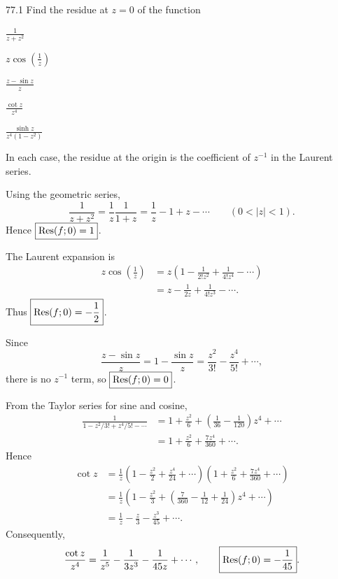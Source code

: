 \documentclass[11pt,oneside]{article}
\begin{document}

\begin{exercise}{77.1}
Find the residue at $z=0$ of the function
\begin{exercisesubparts}
    \item $\displaystyle\frac{1}{z+z^2}$
    \item $\displaystyle z\cos\left(\frac1z\right)$
    \item $\displaystyle\frac{z-\sin z}{z}$
    \item $\displaystyle\frac{\cot z}{z^4}$
    \item $\displaystyle\frac{\sinh z}{z^4(1-z^2)}$
\end{exercisesubparts}
\end{exercise}

\begin{solution}
In each case, the residue at the origin is the coefficient of $z^{-1}$ in the Laurent series.
\begin{exercisesubparts}
    \item Using the geometric series,
    \[
        \frac1{z+z^2}=\frac1z\frac1{1+z}
        =\frac1z-1+z-\cdots\qquad(0<|z|<1).
    \]
    Hence $\boxed{\operatorname{Res}(f; 0)=1}$.

    \item The Laurent expansion is
    \[
    \begin{aligned}
        z\cos\left(\frac1z\right)
        &=z\left(1-\frac1{2!z^2}+\frac1{4!z^4}-\cdots\right)\\
        &=z-\frac1{2z}+\frac1{4!z^3}-\cdots.
    \end{aligned}
    \]
    Thus $\boxed{\operatorname{Res}(f; 0)=-\frac12}$.

    \item Since
    \[
        \frac{z-\sin z}{z}
        =1-\frac{\sin z}{z}
        =\frac{z^2}{3!}-\frac{z^4}{5!}+\cdots,
    \]
    there is no $z^{-1}$ term, so $\boxed{\operatorname{Res}(f; 0)=0}$.

    \item From the Taylor series for sine and cosine,
    \[
    \begin{aligned}
        \frac1{1-z^2/3!+z^4/5!-\cdots}
        &=1+\frac{z^2}{6}
          +\left(\frac1{36}-\frac1{120}\right)z^4+\cdots\\
        &=1+\frac{z^2}{6}+\frac{7z^4}{360}+\cdots.
    \end{aligned}
    \]
    Hence
    \[
    \begin{aligned}
        \cot z
        &=\frac1z\left(1-\frac{z^2}{2}+\frac{z^4}{24}+\cdots\right)
          \left(1+\frac{z^2}{6}+\frac{7z^4}{360}+\cdots\right)\\
        &=\frac1z\left(1-\frac{z^2}{3}
          +\left(\frac7{360}-\frac1{12}+\frac1{24}\right)z^4+\cdots\right)\\
        &=\frac1z-\frac z3-\frac{z^3}{45}+\cdots.
    \end{aligned}
    \]
    Consequently,
    \[
        \frac{\cot z}{z^4}
        =\frac1{z^5}-\frac1{3z^3}-\frac1{45z}+\cdots,
        \qquad\boxed{\operatorname{Res}(f; 0)=-\frac1{45}}.
    \]


\end{exercisesubparts}
\end{solution}
\end{document}

